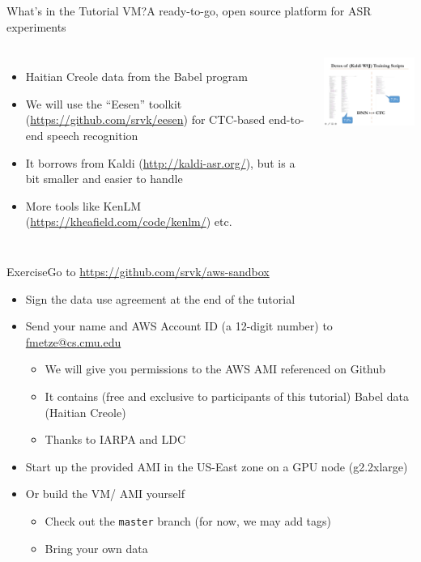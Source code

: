 \begin{frame}{What's in the Tutorial VM?}{A ready-to-go, open source platform for ASR experiments}
  \begin{columns}[c]
    \column{52mm}
    \begin{itemize}
    \item Haitian Creole data from the Babel program
    \item We will use the ``Eesen'' toolkit (\url{https://github.com/srvk/eesen}) for CTC-based end-to-end speech recognition
    \item It borrows from Kaldi (\url{http://kaldi-asr.org/}), but is a bit smaller and easier to handle
    \item More tools like KenLM (\url{https://kheafield.com/code/kenlm/}) etc.
    \end{itemize}
    \column{58mm}
    \includegraphics[width=58mm]{figures/detox}    
  \end{columns}
\end{frame}

\begin{frame}{Exercise}{Go to \url{https://github.com/srvk/aws-sandbox}}
  \begin{itemize}
  \item Sign the data use agreement at the end of the tutorial
  \item Send your name and AWS Account ID (a 12-digit number) to \href{mailto:fmetze@cs.cmu.edu}{fmetze@cs.cmu.edu}
    \begin{itemize}
    \item We will give you permissions to the AWS AMI referenced on Github
    \item It contains (free and exclusive to participants of this tutorial) Babel data (Haitian Creole) 
    \item Thanks to IARPA and LDC
    \end{itemize}
  \item Start up the provided AMI in the US-East zone on a GPU node (g2.2xlarge)
  \item Or build the VM/ AMI yourself
    \begin{itemize}
    \item Check out the \texttt{master} branch (for now, we may add tags)
    \item Bring your own data
    \end{itemize}
  \end{itemize}
\end{frame}

